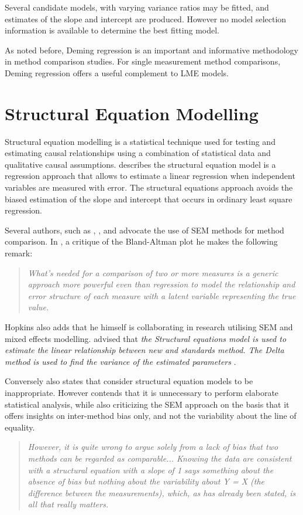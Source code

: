 \documentclass[12pt, a4paper]{report}
\theoremstyle{plain}
\theoremstyle{definition}
\theoremstyle{remark}
\begin{document}
Several candidate models, with varying variance ratios may be fitted, and estimates of the slope and intercept are produced. However no model selection information is available to determine the best fitting model.

As noted before, Deming regression is an important and informative methodology in method comparison studies. For single measurement method comparisons, Deming regression offers a useful complement to LME models.

\section{Structural Equation Modelling}

Structural equation modelling is a statistical technique used for testing and estimating causal relationships using a combination of statistical data and qualitative causal assumptions. \citet{carrasco2004} describes the structural equation model is a regression approach that allows to estimate a linear 
regression when independent variables are measured with error.
The structural equations approach avoids the biased estimation of the slope and intercept that occurs in ordinary least square regression.

Several authors, such as \citet{lewis1991}, \citet{gkelly1985}, \citet{voelkel2005} and \citet{hopkins2004bias} advocate the use of SEM methods for method comparison. In \citet{hopkins2004bias}, a critique of the Bland-Altman plot he makes the following remark:

\begin{quote}
	\textit{What's needed for a comparison of two or more measures is a
		generic approach more powerful even than regression to model the
		relationship and error structure of each measure with a latent
		variable representing the true value.}
\end{quote}	

Hopkins also adds that he himself is collaborating in research utilising SEM and mixed effects modelling. \citet{gkelly1985} advised that \textit{the Structural equations model is used to estimate the linear relationship between new and standards method. The Delta method is used to find the variance of the estimated parameters} \citep{gkelly1985}.


Conversely \citet{BA99} also states that consider structural equation models to be inappropriate. However \citet{BA87} contends that it is unnecessary to perform elaborate statistical analysis, while also criticizing the SEM approach on the basis that it offers insights  on inter-method bias only, and not the variability about the line of equality. 
\begin{quote}
	\textit{However, it is quite wrong to argue solely from a lack of bias that two methods can be regarded as comparable...
		Knowing the data are consistent with a structural equation with a slope of 1 says something 
		about the absence of bias but nothing about the variability about Y = X (the difference between the measurements), which, as has already been stated, is all that really matters.}
\end{quote}
\end{document}
